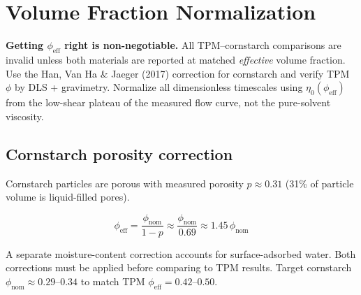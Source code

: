 \documentclass[11pt,letterpaper]{article}
\newcommand{\phieff}{\phi_{\mathrm{eff}}}
\newcommand{\phinom}{\phi_{\mathrm{nom}}}
\begin{document}
\section{Volume Fraction Normalization}

\begin{cautionbox}
\textbf{Getting $\phieff$ right is non-negotiable.} All TPM--cornstarch
comparisons are invalid unless both materials are reported at matched
\emph{effective} volume fraction. Use the Han, Van Ha \& Jaeger (2017)
correction \cite{HanVanHa2017} for cornstarch and verify TPM $\phi$ by
DLS + gravimetry. Normalize all dimensionless timescales using
$\eta_0(\phieff)$ from the low-shear plateau of the measured flow curve,
not the pure-solvent viscosity.
\end{cautionbox}

\subsection{Cornstarch porosity correction \cite{HanVanHa2017}}

Cornstarch particles are porous with measured porosity $p \approx 0.31$
(31\% of particle volume is liquid-filled pores).

\begin{equation}
  \phieff = \frac{\phinom}{1 - p} \approx \frac{\phinom}{0.69} \approx 1.45\,\phinom
  \label{eq:phi_correction}
\end{equation}

A separate moisture-content correction accounts for surface-adsorbed water.
Both corrections must be applied before comparing to TPM results. Target
cornstarch $\phinom \approx 0.29$--$0.34$ to match TPM $\phieff = 0.42$--$0.50$.
\end{document}
